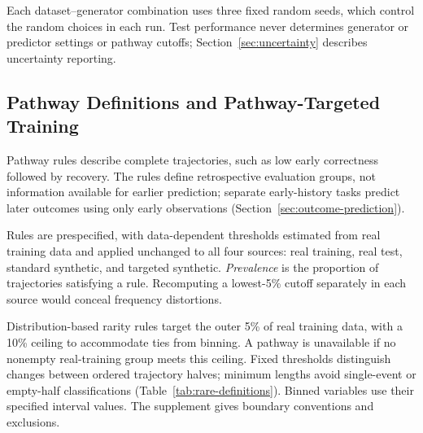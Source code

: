 \documentclass[fleqn,10pt]{JLA_article}
\begin{document}
Each dataset--generator combination uses three fixed random seeds, which control the random choices in each run. Test performance never determines generator or predictor settings or pathway cutoffs; Section~\ref{sec:uncertainty} describes uncertainty reporting.

\subsection{Pathway Definitions and Pathway-Targeted Training}

Pathway rules describe complete trajectories, such as low early correctness followed by recovery. The rules define retrospective evaluation groups, not information available for earlier prediction; separate early-history tasks predict later outcomes using only early observations (Section~\ref{sec:outcome-prediction}).

Rules are prespecified, with data-dependent thresholds estimated from real training data and applied unchanged to all four sources: real training, real test, standard synthetic, and targeted synthetic. \emph{Prevalence} is the proportion of trajectories satisfying a rule. Recomputing a lowest-5\% cutoff separately in each source would conceal frequency distortions.

Distribution-based rarity rules target the outer 5\% of real training data, with a 10\% ceiling to accommodate ties from binning. A pathway is unavailable if no nonempty real-training group meets this ceiling. Fixed thresholds distinguish changes between ordered trajectory halves; minimum lengths avoid single-event or empty-half classifications (Table~\ref{tab:rare-definitions}). Binned variables use their specified interval values. The supplement gives boundary conventions and exclusions.
\end{document}
